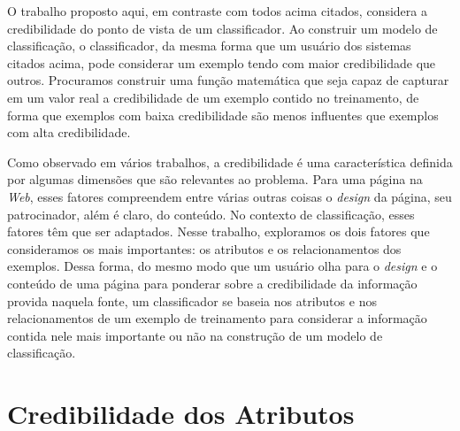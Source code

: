 O trabalho proposto aqui, em contraste com todos acima citados, considera a credibilidade do ponto de vista de um classificador. Ao construir um modelo de classificação, o classificador, da mesma forma que um usuário dos sistemas citados acima, pode considerar um exemplo tendo com maior credibilidade que outros. Procuramos construir uma função matemática que seja capaz de capturar em um valor real a credibilidade de um exemplo contido no treinamento, de forma que exemplos com baixa credibilidade são menos influentes que exemplos com alta credibilidade.

Como observado em vários trabalhos, a credibilidade é uma característica definida por algumas dimensões que são relevantes ao problema. Para uma página na \textit{Web}, esses fatores compreendem entre várias outras coisas o \textit{design} da página, seu patrocinador, além é claro, do conteúdo. No contexto de classificação, esses fatores têm que ser adaptados. Nesse trabalho, exploramos os dois fatores que consideramos os mais importantes: os atributos e os relacionamentos dos exemplos. Dessa forma, do mesmo modo que um usuário olha para o \textit{design} e o conteúdo de uma página para ponderar sobre a credibilidade da informação provida naquela fonte, um classificador se baseia nos atributos e nos relacionamentos de um exemplo de treinamento para considerar a informação contida nele mais importante ou não na construção de um modelo de classificação.



\section{Credibilidade dos Atributos}
\label{sec::supervised}

